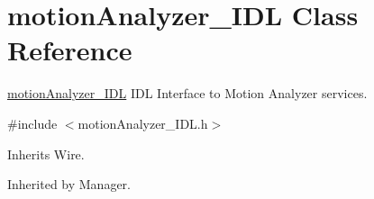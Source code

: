 \section{motion\+Analyzer\+\_\+\+I\+DL Class Reference}
\label{classmotionAnalyzer__IDL}


\hyperlink{classmotionAnalyzer__IDL}{motion\+Analyzer\+\_\+\+I\+DL} I\+DL Interface to Motion Analyzer services.  




{\ttfamily \#include $<$motion\+Analyzer\+\_\+\+I\+D\+L.\+h$>$}



Inherits Wire.



Inherited by Manager.

